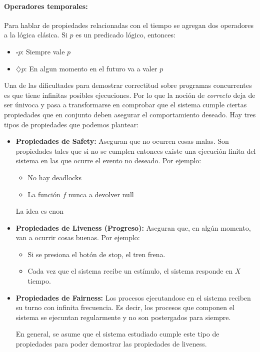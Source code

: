 \paragraph{Operadores temporales:} Para hablar de propiedades relacionadas con el tiempo se agregan dos operadores a la lógica clásica. Si $p$ es un predicado lógico, entonces:
\begin{itemize}
	\item$\square p$: Siempre vale $p$
	\item$\diamondsuit p$: En algun momento en el futuro va a valer $p$
\end{itemize}
\vspace*{.5cm}
Una de las dificultades para demostrar correctitud sobre 
programas concurrentes es que tiene infinitas posibles ejecuciones. Por lo que la noción de \textit{correcto} deja de ser únivoca y pasa a transformarse en comprobar que el sistema cumple ciertas propiedades que en conjunto deben asegurar el comportamiento deseado. Hay tres tipos de propiedades que podemos plantear: 

\begin{itemize}
	\item \textbf{Propiedades de Safety:} Aseguran que no ocurren cosas malas. Son propiedades tales que si no se cumplen entonces existe una ejecución finita del sistema en las que ocurre el evento no deseado. Por ejemplo:
	\begin{itemize}
		\item No hay deadlocks
		\item La función $f$ nunca a devolver null
	\end{itemize}
	La idea es enon
	\item \textbf{Propiedades de Liveness (Progreso):} Aseguran que, en algún momento, van a ocurrir cosas buenas. Por ejemplo:
	\begin{itemize}
		\item Si se presiona el botón de stop, el tren frena.
		\item Cada vez que el sistema recibe un estímulo, el sistema responde en $X$ tiempo.
	\end{itemize}
	\item \textbf{Propiedades de Fairness:} Los procesos ejecutandose en el sistema reciben su turno con infinita frecuencia. Es decir, los procesos que componen el sistema se ejecuntan regularmente y no son postergados para siempre.
	
	En general, se asume que el sistema estudiado cumple este tipo de propiedades para poder demostrar las propiedades de liveness.
\end{itemize}

